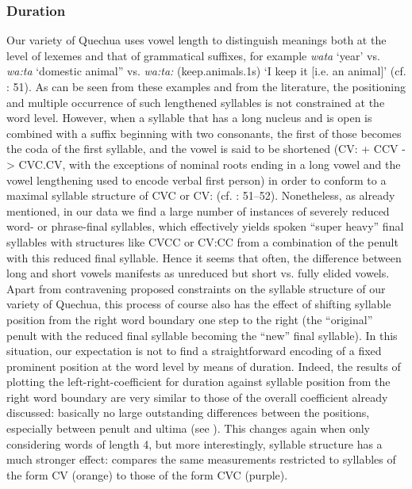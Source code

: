 \documentclass[output=paper]{LSP/langsci}
\begin{document}
\subsubsection{Duration}
Our variety of Quechua uses vowel length to distinguish meanings both at the level of lexemes and that of grammatical suffixes, for example \textit{wata} `year' vs. \textit{wa\textipa:ta} `domestic animal” vs. \textit{wa\textipa:ta\textipa:} (keep.animals.1s) `I keep it [i.e. an animal]' (cf. \citealt{Parker1976}: 51). As can be seen from these examples and from the literature, the positioning and multiple occurrence of such lengthened syllables is not constrained at the word level. However, when a syllable that has a long nucleus and is open is combined with a suffix beginning with two consonants, the first of those becomes the coda of the first syllable, and the vowel is said to be shortened (CV\textipa: + CCV -> CVC.CV, with the exceptions of nominal roots ending in a long vowel and the vowel lengthening used to encode verbal first person) in order to conform to a maximal syllable structure of CVC or CV\textipa: (cf. \citealt{Parker1976}: 51–52). Nonetheless, as already mentioned, in our data we find a large number of instances of severely reduced word- or phrase-final syllables, which effectively yields spoken “super heavy” final syllables with structures like CVCC or CV\textipa:CC from a combination of the penult with this reduced final syllable. Hence it seems that often, the difference between long and short vowels manifests as unreduced but short vs. fully elided vowels. Apart from contravening proposed constraints on the syllable structure of our variety of Quechua, this process of course also has the effect of shifting syllable position from the right word boundary one step to the right (the “original” penult with the reduced final syllable becoming the “new” final syllable). In this situation, our expectation is not to find a straightforward encoding of a fixed prominent position at the word level by means of duration. Indeed, the results of plotting the left-right-coefficient for duration against syllable position from the right word boundary are very similar to those of the overall coefficient already discussed: basically no large outstanding differences between the positions, especially between penult and ultima (see ). This changes again when only considering words of length 4, but more interestingly, syllable structure has a much stronger effect:  compares the same measurements restricted to syllables of the form CV (orange) to those of the form CVC (purple).\largerpage[-1]   
\end{document}
